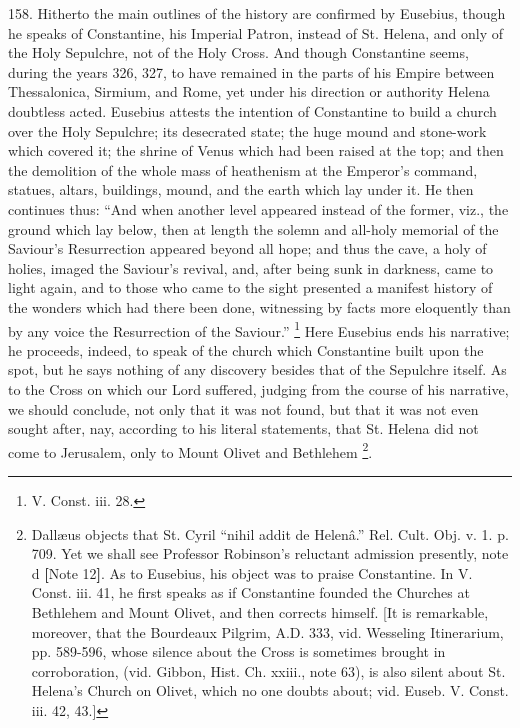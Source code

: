 158.
Hitherto the main outlines of the history are confirmed by Eusebius,
though he speaks of Constantine, his Imperial Patron, instead of St.
Helena, and only of the Holy Sepulchre, not of the Holy Cross.
And though Constantine seems, during the years 326, 327, to have
remained in the parts of his Empire between Thessalonica, Sirmium, and
Rome, yet under his direction or authority Helena doubtless acted.
Eusebius attests the intention of Constantine to build a church over
the Holy Sepulchre; its desecrated state; the huge mound and
stone-work which covered it; the shrine of Venus which had been raised
at the top; and then the demolition of the whole mass of heathenism at
the Emperor's command, statues, altars, buildings, mound, and the
earth which lay under it. He then continues thus: ``And when
another level appeared instead of the former, viz., the ground which
lay below, then at length the solemn and all-holy memorial of the
Saviour's Resurrection appeared beyond all hope; and thus the cave, a
holy of holies, imaged the Saviour's revival, and, after being sunk in
darkness, came to light again, and to those who came to the sight
presented a manifest history of the wonders which had there been done,
witnessing by facts more eloquently than by any voice the Resurrection
of the Saviour.'' \footnote{V. Const. iii. 28.} Here
Eusebius ends his narrative; he proceeds, indeed, to speak of the
church which Constantine built upon the spot, but he says nothing of
any discovery besides that of the Sepulchre itself. As to the Cross on
which our Lord suffered, judging from the course of his narrative,
we should conclude, not only that it was not found, but that it
was not even sought after, nay, according to his literal statements,
that St. Helena did not come to Jerusalem, only to Mount Olivet and
Bethlehem \footnote{Dallæus objects that St. Cyril ``nihil addit de Helenâ.'' Rel. Cult.
Obj. v. 1. p. 709. Yet we shall see Professor Robinson's reluctant
admission presently, note d \textbf{[}Note
12\textbf{]}. As to Eusebius, his object
was to praise Constantine. In V. Const. iii. 41, he first speaks as if
Constantine founded the Churches at Bethlehem and Mount Olivet, and
then corrects himself. [It is remarkable, moreover, that the Bourdeaux
Pilgrim, A.D. 333, vid.
Wesseling Itinerarium, pp. 589-596, whose silence about the Cross is
sometimes brought in corroboration, (vid. Gibbon, Hist. Ch. xxiii.,
note 63), is also silent about St. Helena's Church on Olivet, which no
one doubts about; vid. Euseb. V. Const. iii. 42, 43.]}.

